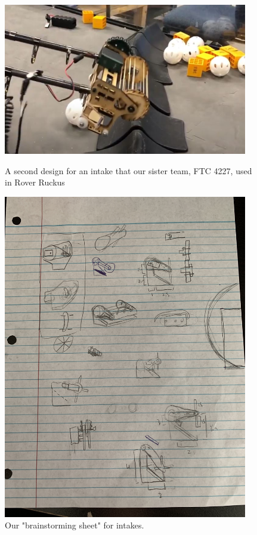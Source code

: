 \begin{figure}[ht]
\centering
\begin{minipage}[b]{.48\textwidth}
  \centering
  \includegraphics[width=0.95\textwidth]{Meetings/August/08-20-21/8-18-21_CAD_Image3 - Nathan Forrer.jpg}
  \caption{A second design for an intake that our sister team, FTC 4227, used in Rover Ruckus}
  \label{fig:pic3}
\end{minipage}%
\hfill%
\begin{minipage}[b]{.48\textwidth}
  \centering
  \includegraphics[width=0.95\textwidth]{Meetings/August/08-20-21/8-18-21_CAD_Image4 - Nathan Forrer.jpg}
  \caption{Our "brainstorming sheet" for intakes.}
  \label{fig:pic4}
\end{minipage}
\end{figure}

